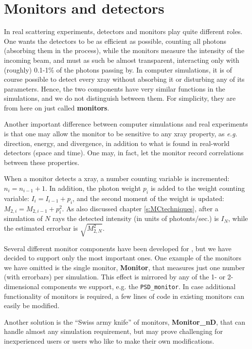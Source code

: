 \chapter{Monitors and detectors}

In real scattering experiments, detectors and monitors play quite
different roles. One wants the detectors to be as efficient as
possible, counting all photons (absorbing them in the process),
while the monitors measure the intensity of the incoming beam, and must
as such be almost transparent, interacting only with (roughly) 0.1-1\%
of the photons passing by. In computer simulations, it is
of course possible to detect every xray without
absorbing it or disturbing any of its parameters. Hence, the two components
have very similar functions in the simulations, and we do
not distinguish between them. For simplicity, they are from here on
just called \textbf{monitors}.

Another important difference between computer simulations
and real experiments is
that one may allow the monitor to be sensitive to any xray property,
as {\em e.g.} direction, energy, and divergence, in addition to what
is found in real-world detectors (space and time). One may, in
fact, let the monitor    record correlations between these properties.

When a monitor detects a xray,
a number counting variable is incremented: $n_i = n_{i-1}+1$.
In addition, the photon
weight $p_i$ is added to the weight counting variable:
$I_i = I_{i-1} + p_i$,
and the second moment of the weight is
updated: $M_{2,i} = M_{2,i-1} + p_i^2$.
As also discussed chapter \ref{s:MCtechniques}, after a simulation of $N$ rays
the detected intensity (in units of photonts/sec.) is $I_N$,
while the estimated errorbar is $\sqrt{M_{2,N}^2}$.

Several different monitor components have been developed for
\MCX , but we have decided to support only the most important ones.
One example of the monitors we have omitted is the single monitor,
\textbf{Monitor},
that measures just one number (with errorbars) per simulation.
This effect is mirrored by any of the 1- or 2-dimensional components
we support, e.g. the \texttt{PSD\_monitor}.
In case additional functionality of monitors is required,
a few lines of code in existing monitors can easily be modified.

Another solution is the ``Swiss army knife'' of monitors, \textbf{Monitor\_nD}, that can handle
almost any simulation requirement, but may prove challenging for inexperienced users or users who like to make their own modifications.

\newpage
%

%







%

%

\newpage

